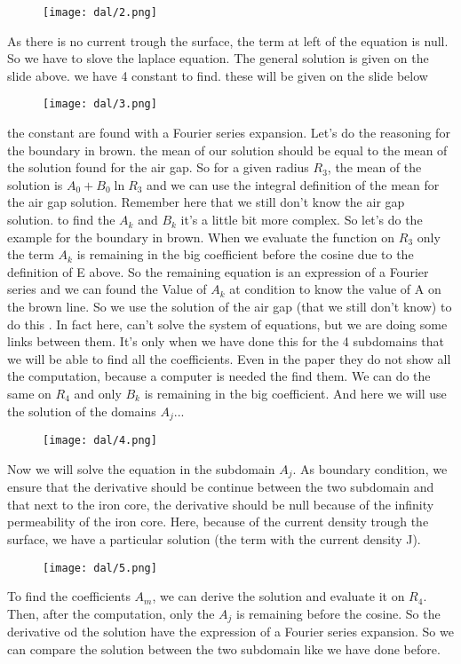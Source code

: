 \begin{figure}[H]
    \centering
    \texttt{[image: dal/2.png]}
\end{figure}
As there is no current trough the surface, the term at left of the equation is null. So we have to slove the laplace equation.
The general solution is given on the slide above. we have 4 constant to find. these will be given on the slide below

\begin{figure}[H]
    \centering
    \texttt{[image: dal/3.png]}
\end{figure}
the constant are found with a Fourier series expansion. Let's do the reasoning for the boundary in brown. the mean of our solution should be equal to the mean of the solution found for the air gap. So for a given radius $R_3$, the mean of the solution is $A_0 + B_0\ln{R_3}$ and we can use the integral definition of the mean for the air gap solution. Remember here that we still don't know the air gap solution.
to find the $A_k$ and $B_k$ it's a little bit more complex. So let's do the example for the boundary in brown. When we evaluate the function on $R_3$ only the term $A_k$ is remaining in the big coefficient before the cosine due to the definition of E above. So the remaining equation is an expression of a Fourier series and we can found the Value of $A_k$ at condition to know the value of A on the brown line. So we use the solution of the air gap (that we still don't know) to do this . In fact here, can't solve the system of equations, but we are doing some links between them. It's only when we have done this for the 4 subdomains that we will be able to find all the coefficients. Even in the paper they do not show all the computation, because a computer is needed the find them. We can do the same on $R_4$ and only $B_k$ is remaining in the big coefficient. And here we will use the solution of the domains $A_j$... 

\begin{figure}[H]
    \centering
    \texttt{[image: dal/4.png]}
\end{figure}

Now we will solve the equation in the subdomain $A_j$. As boundary condition, we ensure that the derivative should be continue between the two subdomain and that next to the iron core, the derivative should be null because of the infinity permeability of the iron core. Here, because of the current density trough the surface, we have a particular solution (the term with the current density J).
\begin{figure}[H]
    \centering
    \texttt{[image: dal/5.png]}
\end{figure}
To find the coefficients $A_m$, we can derive the solution and evaluate it on $R_4$. Then, after the computation, only the $A_j$ is remaining before the cosine. So the derivative od the solution have the expression of a Fourier series expansion. So we can compare the solution between the two subdomain like we have done before.

